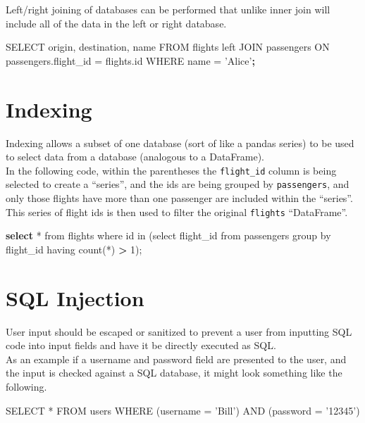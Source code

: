 \documentclass[]{book}
\newenvironment{Shaded}{\begin{snugshade}}{\end{snugshade}}
\newcommand{\KeywordTok}[1]{\textcolor[rgb]{0.13,0.29,0.53}{\textbf{#1}}}
\newcommand{\StringTok}[1]{\textcolor[rgb]{0.31,0.60,0.02}{#1}}
\newcommand{\OperatorTok}[1]{\textcolor[rgb]{0.81,0.36,0.00}{\textbf{#1}}}
\newcommand{\ExtensionTok}[1]{#1}
\newcommand{\NormalTok}[1]{#1}
\begin{document}
Left/right joining of databases can be performed that unlike inner join
will include all of the data in the left or right database.

\begin{Shaded}
\begin{Highlighting}[]
\ExtensionTok{SELECT}\NormalTok{ origin, destination, name FROM flights left JOIN passengers ON passengers.flight_id = flights.id WHERE name = }\StringTok{'Alice'}\KeywordTok{;}
\end{Highlighting}
\end{Shaded}

\section{Indexing}\label{indexing}

Indexing allows a subset of one database (sort of like a pandas series)
to be used to select data from a database (analogous to a DataFrame).\\
In the following code, within the parentheses the \texttt{flight\_id}
column is being selected to create a ``series'', and the ids are being
grouped by \texttt{passengers}, and only those flights have more than
one passenger are included within the ``series''. This series of flight
ids is then used to filter the original \texttt{flights} ``DataFrame''.

\begin{Shaded}
\begin{Highlighting}[]
\KeywordTok{select} \ExtensionTok{*}\NormalTok{ from flights where id in (select flight_id from passengers group by flight_id having count(*) }\OperatorTok{>} \ExtensionTok{1}\NormalTok{);}
\end{Highlighting}
\end{Shaded}

\section{SQL Injection}\label{sql-injection}

User input should be escaped or sanitized to prevent a user from
inputting SQL code into input fields and have it be directly executed as
SQL.\\
As an example if a username and password field are presented to the
user, and the input is checked against a SQL database, it might look
something like the following.

\begin{Shaded}
\begin{Highlighting}[]
\ExtensionTok{SELECT}\NormalTok{ * FROM users WHERE (username = }\StringTok{'Bill'}\NormalTok{) }\ExtensionTok{AND}\NormalTok{ (password = }\StringTok{'12345'}\NormalTok{)}
\end{Highlighting}
\end{Shaded}
\end{document}
